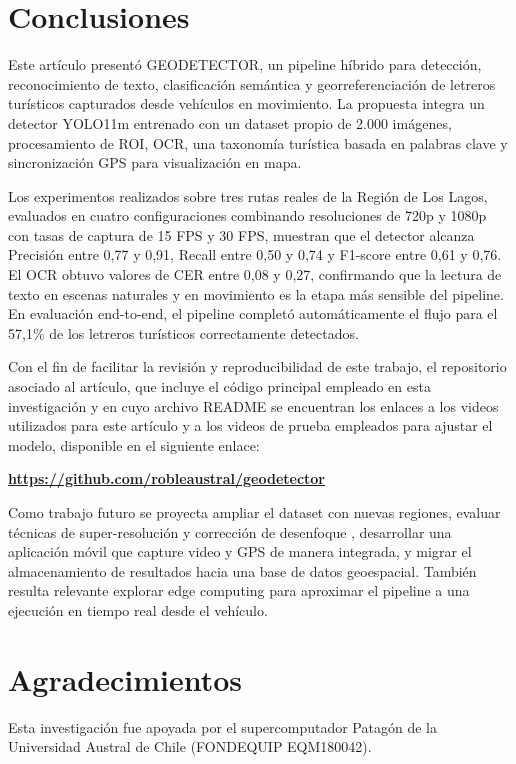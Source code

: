 \documentclass[conference]{IEEEtran}
\begin{document}
\section{Conclusiones}

Este artículo presentó GEODETECTOR, un pipeline híbrido para detección, 
reconocimiento de texto, clasificación semántica y georreferenciación de 
letreros turísticos capturados desde vehículos en movimiento. La propuesta
integra un detector YOLO11m entrenado con un dataset propio de 2.000 
imágenes, procesamiento de ROI, OCR, una taxonomía turística basada en 
palabras clave y sincronización GPS para visualización en mapa.

Los experimentos realizados sobre tres rutas reales de la Región de Los 
Lagos, evaluados en cuatro configuraciones combinando resoluciones de 
720p y 1080p con tasas de captura de 15 FPS y 30 FPS, muestran que el 
detector alcanza Precisión entre 0,77 y 0,91, Recall entre 0,50 y 0,74 
y F1-score entre 0,61 y 0,76. El OCR obtuvo valores de CER entre 0,08 
y 0,27, confirmando que la lectura de texto en escenas naturales y en movimiento
es la etapa más sensible del pipeline. En evaluación end-to-end, el pipeline completó 
automáticamente el flujo para el 57,1\% de los letreros turísticos 
correctamente detectados.

Con el fin de facilitar la revisión y reproducibilidad de este trabajo, el repositorio asociado al artículo,
que incluye el código principal empleado en esta investigación y en cuyo archivo README se encuentran los enlaces 
a los videos utilizados para este artículo y a los videos de prueba empleados para ajustar el modelo, 
disponible en el siguiente enlace:

\begin{center}
\textbf{\url{https://github.com/robleaustral/geodetector}}
\end{center}

Como trabajo futuro se proyecta ampliar el dataset con nuevas regiones, 
evaluar técnicas de super-resolución \cite{ultralytics_super_resolution} y corrección de desenfoque \cite{correcion-desenfoque}, 
desarrollar una aplicación móvil que capture video y GPS de manera 
integrada, y migrar el almacenamiento de resultados hacia una base de 
datos geoespacial. También resulta relevante explorar edge computing para aproximar el pipeline a una ejecución en tiempo real desde el 
vehículo.

\section*{Agradecimientos}

Esta investigación fue apoyada por el supercomputador Patagón de la 
Universidad Austral de Chile (FONDEQUIP EQM180042).

\balance


\end{document}
